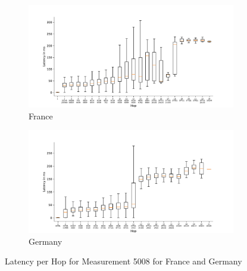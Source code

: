 \begin{figure}
	\centering
	\begin{subfigure}[b]{\linewidth}
		\includegraphics[width=\linewidth]{chapters/4-results/traceroute/img/latency-per-hop-FR-5008.pdf}
		\caption{France}
	\end{subfigure}
	\begin{subfigure}[b]{\linewidth}
		\includegraphics[width=\linewidth]{chapters/4-results/traceroute/img/latency-per-hop-DE-5008.pdf}
		\caption{Germany}
	\end{subfigure}
	\caption{Latency per Hop for Measurement 5008 for France and Germany}
	\label{fig:latency-change-per-hop-appendix-8}
\end{figure}


